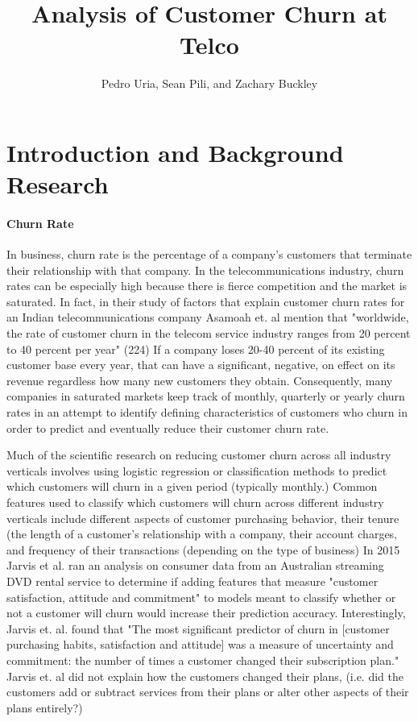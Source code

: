 \documentclass[man]{apa6}
\title{Analysis of Customer Churn at Telco}
\author{Pedro Uria, Sean Pili, and Zachary Buckley}
\affiliation{George Washington University}
\begin{document}
\maketitle

\section{Introduction and Background Research}
\paragraph{Churn Rate}

In business, churn rate is the percentage of a company's customers that terminate their relationship with that company. In the telecommunications industry, churn rates can be especially high because there is fierce competition and the market is saturated. In fact, in their study of factors that explain customer churn rates for an Indian telecommunications company  Asamoah et. al mention that "worldwide, the rate of customer churn in the telecom service industry ranges from 20 percent to 40 percent per year" (224) If a company loses 20-40 percent of its existing customer base every year, that can have a significant, negative, on effect on its revenue regardless how many new customers they obtain.  Consequently, many companies in saturated markets keep track of monthly, quarterly or yearly churn rates in an attempt to identify defining characteristics of customers who churn in order to predict and eventually reduce their customer churn rate. 

Much of the scientific research on reducing customer churn across all industry verticals involves using logistic regression or classification methods to predict which customers will churn in a given period (typically monthly.) Common features used to classify which customers will churn across different industry verticals include different aspects of customer purchasing behavior, their tenure (the length of a customer's relationship with a company, their account charges,  and frequency of their transactions (depending on the type of business)  In 2015 Jarvis et al. ran an analysis on consumer data from an Australian streaming DVD rental service to determine if adding features that measure "customer satisfaction, attitude and commitment" to models meant to classify whether or not a customer will churn would increase their prediction accuracy.  Interestingly, Jarvis et. al. found that "The most significant predictor of churn in [customer purchasing habits, satisfaction and attitude] was a measure of uncertainty and commitment: the number of times a customer changed their subscription plan." Jarvis et. al did not explain how the customers changed their plans, (i.e. did the customers add or subtract services from their plans or alter other aspects of their plans entirely?)  
\end{document}
